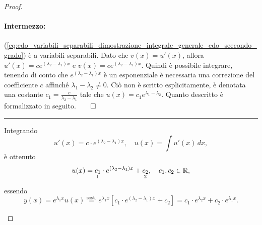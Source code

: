 \begin{proof}
\begin{enumerate}
		\paragraph{Intermezzo:}(\ref{eq:edo_variabili_separabili_dimostrazione_integrale_generale_edo_seecondo_grado}) è a variabili separabili. Dato che $v(x)=u'(x)$, allora $u'(x)=ce^{(\lambda_2-\lambda_1)x}$ e $v(x)=ce^{(\lambda_2-\lambda_1)x}$. Quindi è possibile integrare, tenendo di conto che $e^{(\lambda_2-\lambda_1)x}$ è un esponenziale è necessaria una correzione del coefficiente $c$ affinché $\lambda_1-\lambda_2\neq 0$. Ciò non è scritto esplicitamente, è denotata una costante $c_1=\frac{c}{\lambda_2-\lambda_1}$ tale che $u(x) = c_1 e^{\lambda_1-\lambda_2}$. Quanto descritto è formalizzato in seguito.$\qed$
		\hrule\vspace{2px}
		
		\noindent Integrando
		\begin{equation*}
			u'(x)=c\cdot e^{(\lambda_2-\lambda_1)x},\quad u(x)=\int u'(x)\,dx,
		\end{equation*}
		è ottenuto
		\begin{equation*}
			u(x)=\underset{\footnotemark}{c_1}\cdot e^{(\lambda_2-\lambda_1)x}+\underset{\footnotemark}{c_2},\quad c_1,c_2\in\mathbb{R},
		\end{equation*}
		essendo
		\begin{equation*}
			y(x)=e^{\lambda_1 x}u(x)\overset{\text{sost.}}{=}e^{\lambda_1x}\left[c_1\cdot e^{(\lambda_2-\lambda_1)x}+c_2\right] = c_1\cdot e^{\lambda_2 x} + c_2\cdot e^{\lambda_1 x}.
		\end{equation*}
		
		\addtocounter{footnote}{-1}
		
		

\end{enumerate}
\end{proof}
